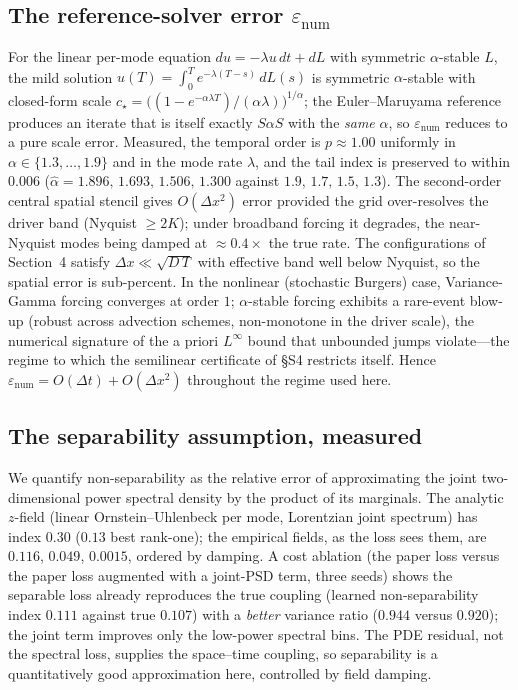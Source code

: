 \documentclass[review,12pt]{elsarticle}
\begin{document}
\subsection{The reference-solver error $\varepsilon_{\mathrm{num}}$}
For the linear per-mode equation $du = -\lambda u\,dt + dL$ with
symmetric $\alpha$-stable $L$, the mild solution
$u(T) = \int_0^T e^{-\lambda(T-s)}\,dL(s)$ is symmetric $\alpha$-stable
with closed-form scale
$c_\star = \big((1-e^{-\alpha\lambda T})/(\alpha\lambda)\big)^{1/\alpha}$;
the Euler--Maruyama reference produces an iterate that is itself exactly
$S\alpha S$ with the \emph{same} $\alpha$, so $\varepsilon_{\mathrm{num}}$
reduces to a pure scale error. Measured, the temporal order is
$p \approx 1.00$ uniformly in $\alpha \in \{1.3,\dots,1.9\}$ and in the
mode rate $\lambda$, and the tail index is preserved to within $0.006$
($\hat\alpha = 1.896,\,1.693,\,1.506,\,1.300$ against
$1.9,\,1.7,\,1.5,\,1.3$). The second-order central spatial stencil gives
$O(\Delta x^2)$ error provided the grid over-resolves the driver band
(Nyquist $\ge 2K$); under broadband forcing it degrades, the
near-Nyquist modes being damped at $\approx 0.4\times$ the true rate.
The configurations of Section~4 satisfy $\Delta x \ll \sqrt{D\,T}$ with
effective band well below Nyquist, so the spatial error is sub-percent.
In the nonlinear (stochastic Burgers) case, Variance-Gamma forcing
converges at order $1$; $\alpha$-stable forcing exhibits a rare-event
blow-up (robust across advection schemes, non-monotone in the driver
scale), the numerical signature of the a priori $L^\infty$ bound that
unbounded jumps violate---the regime to which the semilinear certificate
of \S S4 restricts itself. Hence
$\varepsilon_{\mathrm{num}} = O(\Delta t) + O(\Delta x^2)$ throughout the
regime used here.

\subsection{The separability assumption, measured}
We quantify non-separability as the relative error of approximating the
joint two-dimensional power spectral density by the product of its
marginals. The analytic $z$-field (linear Ornstein--Uhlenbeck per mode,
Lorentzian joint spectrum) has index $0.30$ ($0.13$ best rank-one); the
empirical fields, as the loss sees them, are $0.116$, $0.049$, $0.0015$,
ordered by damping. A cost ablation (the paper loss versus the paper
loss augmented with a joint-PSD term, three seeds) shows the separable
loss already reproduces the true coupling (learned non-separability
index $0.111$ against true $0.107$) with a \emph{better} variance ratio
($0.944$ versus $0.920$); the joint term improves only the low-power
spectral bins. The PDE residual, not the spectral loss, supplies the
space--time coupling, so separability is a quantitatively good
approximation here, controlled by field damping.
\end{document}
